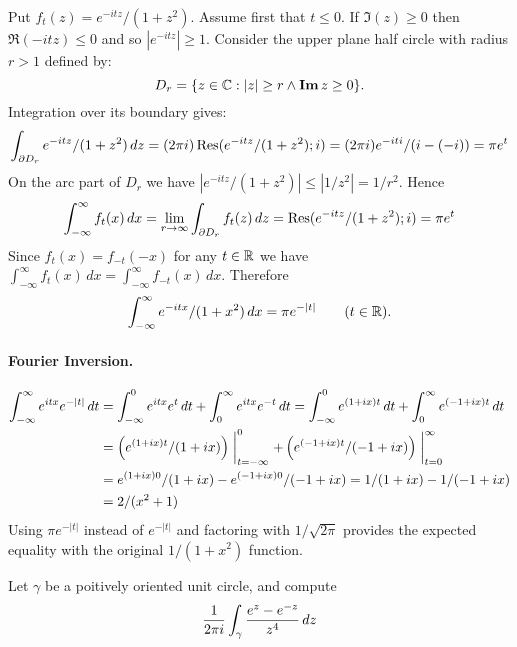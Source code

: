 \begin{enumerate}
Put \(f_t(z) = e^{-itz}/(1+z^2)\). 
Assume first that \(t\leq 0\). 
If \(\Im(z)\geq 0\) then \(\Re(-itz) \leq 0\) and so \(|e^{-itz}|\geq 1\).
Consider the 
 upper plane half circle with radius \(r>1\) defined by:
\begin{equation*}
D_r = \{z\in\mathbb{C}: |z|\geq r \wedge \mathop{\bf Im}\nolimits z \geq 0\}.
\end{equation*}
Integration over its boundary gives:
\begin{equation*}
\int_{\partial D_r} e^{-itz}/(1+z^2)\,dz 
= (2\pi i) \mathop{\rm Res}\nolimits(e^{-itz}/(1+z^2); i)
= (2\pi i) e^{-iti}/(i-(-i)) = \pi e^t
\end{equation*}
On the arc part of \(D_r\) 
we have \(|e^{-itz}/(1+z^2)| \leq |1/z^2| = 1/r^2\).
Hence
\begin{equation*}
\int_{-\infty}^\infty f_t(x)\,dx
= \lim_{r\to\infty} \int_{\partial D_r} f_t(z)\,dz 
= \mathop{\rm Res}\nolimits(e^{-itz}/(1+z^2); i) 
= \pi e^t
\end{equation*}
Since \(f_t(x) = f_{-t}(-x)\) for any \(t\in\mathbb{R}\) we have
\(\int_{-\infty}^\infty f_t(x)\,dx = \int_{-\infty}^\infty f_{-t}(x)\,dx\).
Therefore
\begin{equation*}
\int_{-\infty}^\infty e^{-itx}/(1+x^2)\,dx = \pi e^{-|t|} \qquad(t\in\mathbb{R}).
\end{equation*}

\paragraph{Fourier Inversion.}
\begin{align*}
\int_{-\infty}^\infty e^{itx} e^{-|t|}\,dt
&= \int_{-\infty}^0 e^{itx} e^{t}\,dt  + \int_0^\infty e^{itx} e^{-t}\,dt
 = \int_{-\infty}^0 e^{(1+ix)t}\,dt  + \int_0^\infty e^{(-1+ix)t}\,dt \\
&=   \left(e^{(1+ix)t}/(1+ix)\right)\biggm|_{t=-\infty}^0
   + \left(e^{(-1+ix)t}/(-1+ix)\right)\biggm|_{t=0}^\infty \\
&= e^{(1+ix)0}/(1+ix) - e^{(-1+ix)0}/(-1+ix) 
 = 1/(1+ix) - 1/(-1+ix) \\
&= 2/(x^2+1)
\end{align*}
Using \(\pi e^{-|t|}\) instead of \(e^{-|t|}\) 
and factoring with \(1/\sqrt{2\pi}\) provides 
the expected equality with the original \(1/(1+x^2)\) function.



\begin{excopy}
Let \(\gamma\) be a poitively oriented unit circle, and compute
\begin{equation*}
\frac{1}{2\pi i} \int_\gamma \frac{e^z - e^{-z}}{z^4}\,dz
\end{equation*}
\end{excopy}


\end{enumerate}
